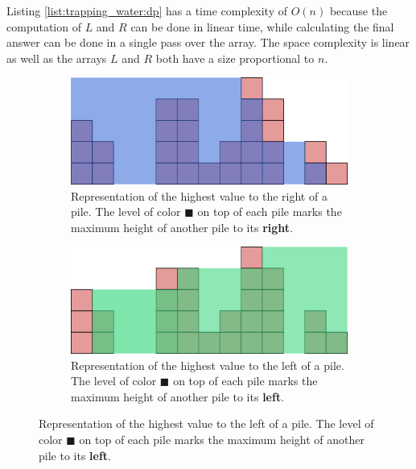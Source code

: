 Listing \ref{list:trapping_water:dp} has a time complexity of $O(n)$ because the computation of $L$ and $R$ can be done in linear time, while calculating the final answer can be done in a single pass over the array. The space complexity is linear as well as the arrays $L$ and $R$ both have a size proportional to $n$.

\begin{figure}
\centering
\begin{subfigure}[b]{0.95\textwidth}
   \includegraphics[width=1\linewidth]{sources/trapping_water/images/DPR}
   \caption{Representation of the highest value to the right of a pile. The level of color \textcolor[HTML]{3268d5}{$\blacksquare$} on top of each pile marks the maximum height of another pile to its \textbf{right}.}
   \label{fig:trapping_water_DPL}
\end{subfigure}

\begin{subfigure}[b]{0.95\textwidth}
   \includegraphics[width=1\linewidth]{sources/trapping_water/images/DPL}
   \caption{Representation of the highest value to the left of a pile. The level of color \textcolor[HTML]{32d579}{$\blacksquare$} on top of each pile marks the maximum height of another pile to its \textbf{left}.}
   \label{fig:trapping_water_DPR}
\end{subfigure}


\end{figure}
